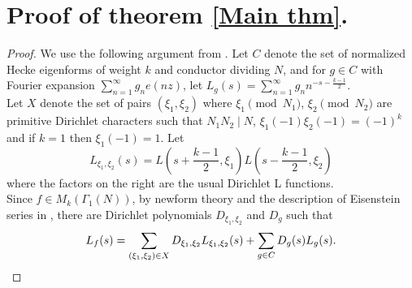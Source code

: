 \documentclass[a4paper,12.5pt]{amsart}
\theoremstyle{definition}
\theoremstyle{remark}
\begin{document}
                 \section{Proof of theorem \ref{Main thm}.}
                 \begin{proof}
                 We use the following argument from \cite{Converse}. 
                Let $C$ denote the set of normalized Hecke eigenforms of weight $k$ and conductor dividing $N$, and for $g \in C$ with Fourier expansion $\sum_{n=1}^{\infty} g_n e(nz)$, let $L_g(s) = \sum_{n=1}^{\infty} g_n n^{-s - \frac{k-1}{2}}$. \\
                
                  Let $X$ denote the set of pairs $(\xi_1, \xi_2)$ where $\xi_1 \pmod{N_1}$, $\xi_2 \pmod{N_2}$ are primitive Dirichlet characters such that $N_1N_2 \mid N$, $\xi_1(-1) \xi_2 (-1)=(-1)^k$ and if $k=1$ then $\xi_1(-1)=1$. Let 
                  \begin{equation*} L_{\xi_1, \xi_2}(s)= L(s+ \frac{k-1}{2} , \xi_1) L(s- \frac{k-1}{2}, \xi_2)          \end{equation*}
                  where the factors on the right are the usual Dirichlet L functions. \\ Since $f \in M_k (\Gamma_1(N))$, by newform theory and the description of Eisenstein series in \cite[Chapter~4.7]{miyake2006modular}, there are Dirichlet polynomials $D_{\xi_1, \xi_2}$ and $D_g$ such that 
                  \begin{equation}{\label{Newform}} L_f(s)= \sum_{(\xi_1, \xi_2) \in X}  D_{\xi_1, \xi_2} L_{\xi_1, \xi_2}(s) + \sum_{ g \in C}  D_g(s) L_g(s)       .     \end{equation}
                 

\end{proof}
\end{document}
